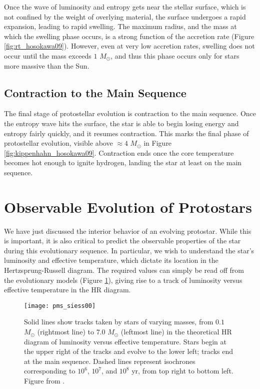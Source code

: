 Once the wave of luminosity and entropy gets near the stellar surface, which is not confined by the weight of overlying material, the surface undergoes a rapid expansion, leading to rapid swelling. The maximum radius, and the mass at which the swelling phase occurs, is a strong function of the accretion rate (Figure \ref{fig:rt_hosokawa09}). However, even at very low accretion rates, swelling does not occur until the mass exceeds $1$ $M_\odot$, and thus this phase occurs only for stars more massive than the Sun.

\subsection{Contraction to the Main Sequence}

The final stage of protostellar evolution is contraction to the main sequence. Once the entropy wave hits the surface, the star is able to begin losing energy and entropy fairly quickly, and it resumes contraction. This marks the final phase of protostellar evolution, visible above $\approx 4$ $M_\odot$ in Figure \ref{fig:kippenhahn_hosokawa09}. Contraction ends once the core temperature becomes hot enough to ignite hydrogen, landing the star at least on the main sequence.

\section{Observable Evolution of Protostars}


We have just discussed the interior behavior of an evolving protostar. While this is important, it is also critical to predict the observable properties of the star during this evolutionary sequence. In particular, we wish to understand the star's luminosity and effective temperature, which dictate its location in the Hertzsprung-Russell diagram. The required values can simply be read off from the evolutionary models (Figure \ref{fig:pms_siess00}), giving rise to a track of luminosity versus effective temperature in the HR diagram.

\begin{figure}
\texttt{[image: pms\_siess00]}
\caption[Pre-main sequence evolutionary tracks]{
\label{fig:pms_siess00}
Solid lines show tracks taken by stars of varying masses, from $0.1$ $M_\odot$ (rightmost line) to $7.0$ $M_\odot$ (leftmost line) in the theoretical HR diagram of luminosity versus effective temperature. Stars begin at the upper right of the tracks and evolve to the lower left; tracks end at the main sequence. Dashed lines represent isochrones corresponding to $10^6$, $10^7$, and $10^8$ yr, from top right to bottom left. Figure from \citet{siess00a}.
}
\end{figure}

